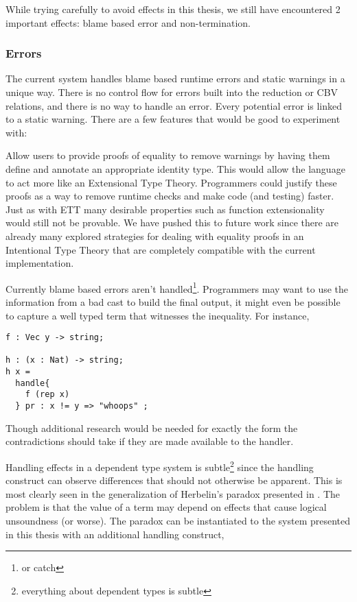 While trying carefully to avoid effects in this thesis, we still have encountered 2 important effects: blame based error and non-termination.

\subsubsection{Errors}

The current system handles blame based runtime errors and static warnings in a unique way.
There is no control flow for errors built into the reduction or CBV relations, and there is no way to handle an error.
Every potential error is linked to a static warning.
There are a few features that would be good to experiment with:

Allow users to provide proofs of equality to remove warnings by having them define and annotate an appropriate identity type.
This would allow the language to act more like an Extensional Type Theory.
Programmers could justify these proofs as a way to remove runtime checks and make code (and testing) faster.
Just as with \ac{ETT} many desirable properties such as function extensionality would still not be provable.
We have pushed this to future work since there are already many explored strategies for dealing with equality proofs in an Intentional Type Theory that are completely compatible with the current implementation.

Currently blame based errors aren't handled\footnote{or catch}.
Programmers may want to use the information from a bad cast to build the final output, it might even be possible to capture a well typed term that witnesses the inequality.
For instance,

\begin{lstlisting}
f : Vec y -> string;

h : (x : Nat) -> string;
h x =
  handle{
    f (rep x)
  } pr : x != y => "whoops" ;
\end{lstlisting}

Though additional research would be needed for exactly the form the contradictions should take if they are made available to the handler.

Handling effects in a dependent type system is subtle\footnote{everything about dependent types is subtle} since the handling construct can observe differences that should not otherwise be apparent.
This is most clearly seen in the generalization of Herbelin's paradox presented in \cite{pedrot2020fire}.
The problem is that the value of a \Bool{} term may depend on effects that cause logical unsoundness (or worse).
The paradox can be instantiated to the system presented in this thesis with an additional handling construct,

